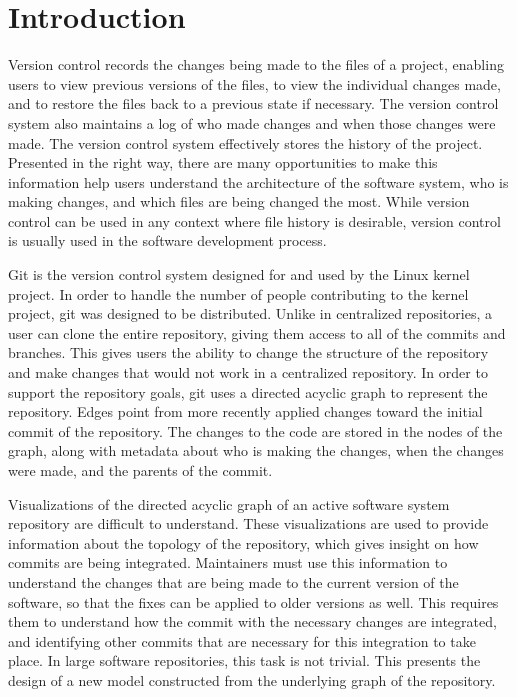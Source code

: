 \chapter{Introduction}

Version control records the changes being made to the files of a
project, enabling users to view previous versions of the files, to view
the individual changes made, and to restore the files back to a previous
state if necessary. The version control system also maintains a log of
who made changes and when those changes were made. The version control
system effectively stores the history of the project. Presented in the
right way, there are many opportunities to make this information help
users understand the architecture of the software system, who is making
changes, and which files are being changed the most. While version
control can be used in any context where file history is desirable,
version control is usually used in the software development process.

Git is the version control system designed for and used by the Linux
kernel project. In order to handle the number of people contributing to
the kernel project, git was designed to be distributed. Unlike in
centralized repositories, a user can clone the entire repository, giving
them access to all of the commits and branches. This gives users the
ability to change the structure of the repository and make changes that
would not work in a centralized repository. In order to support the
repository goals, git uses a directed acyclic graph to represent the
repository. Edges point from more recently applied changes toward the
initial commit of the repository. The changes to the code are stored in
the nodes of the graph, along with metadata about who is making the
changes, when the changes were made, and the parents of the commit.

Visualizations of the directed acyclic graph of an active software
system repository are difficult to understand. These visualizations are
used to provide information about the topology of the repository, which
gives insight on how commits are being integrated. Maintainers must use
this information to understand the changes that are being made to the
current version of the software, so that the fixes can be applied to
older versions as well. This requires them to understand how the commit
with the necessary changes are integrated, and identifying other commits
that are necessary for this integration to take place. In large software
repositories, this task is not trivial. This \paper{} presents the
design of a new model constructed from the underlying graph of the
repository.

